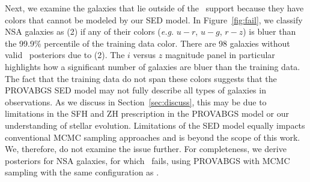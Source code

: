 Next, we examine the galaxies that lie outside of the \sedflow~support because
they have colors that cannot be modeled by our SED model. 
In Figure~\ref{fig:fail}, we classify NSA galaxies as (2) if any of their
colors (\emph{e.g.} $u-r$, $u-g$, $r-z$) is bluer than the 99.9\% percentile of
the training data color. 
There are 98 galaxies without valid \sedflow~posteriors due to (2).
The $i$ versus $z$ magnitude panel in particular highlights how a significant
number of galaxies are bluer than the training data. 
The fact that the training data do not span these colors suggests that the
PROVABGS SED model may not fully describe all types of galaxies in observations. 
As we discuss in Section~\ref{sec:discuss}, this may be due to limitations in
the SFH and ZH prescription in the PROVABGS model or our understanding of
stellar evolution. 
Limitations of the SED model equally impacts conventional MCMC sampling
approaches and is beyond the scope of this work. 
We, therefore, do not examine the issue further. 
For completeness, we derive posteriors for NSA galaxies, for which
\sedflow~fails, using PROVABGS with MCMC sampling with the same configuration
as \cite{hahn2022}. 
